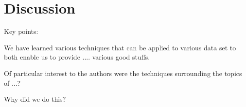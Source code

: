 \chapter{Discussion} \label{ch:discussion}

Key points:

We have learned various techniques that can be applied to various data set to both enable us to provide .... various good stuffs.

Of particular interest to the authors were the techniques surrounding the topics of ...?

Why did we do this?


